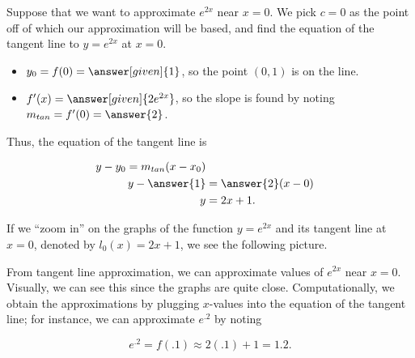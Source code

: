 \documentclass{ximera}
\begin{document}
\begin{model}
Suppose that we want to approximate $e^{2x}$ near $x=0$.  We pick $c=0$ as the point off of which our approximation will be based, and find the equation of the tangent line to $y=e^{2x}$ at $x=0$. 
\begin{itemize}
\item $y_0=f(0) = \answer[given]{1}$, so the point $(0,1)$ is on the line.
\item $f'(x) = \answer[given]{2e^{2x}}$, so the slope is found by noting $m_{tan} = f'(0) = \answer{2}$.
\end{itemize}
Thus, the equation of the tangent line is

\begin{align*}
y-y_0 = m_{tan} (x-x_0) \\
y- \answer{1} &=\answer{2}(x-0) \\
y&=2x+1 .
\end{align*}

If we ``zoom in'' on the graphs of the function $y=e^{2x}$ and its tangent line at $x=0$, denoted by $l_0(x)=2x+1$, we see the following picture.

\begin{image}
\end{image}

From tangent line approximation, we can approximate values of $e^{2x}$ near $x=0$.  Visually, we can see this since the graphs are quite close.  Computationally, we obtain the approximations by plugging $x$-values into the equation of the tangent line; for instance, we can approximate $e^{.2}$ by noting

\[
e^{.2} = f(.1) \approx 2(.1)+1 =1.2.
\]


\end{model}
\end{document}
